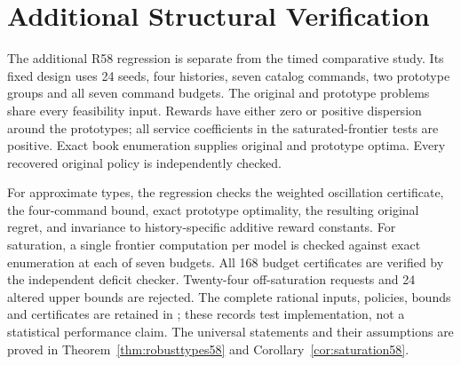 \section{Additional Structural Verification}\label{sec:structuralvalidation58}
The additional R58 regression is separate from the timed comparative study. Its fixed design uses 24 seeds, four histories, seven catalog commands, two prototype groups and all seven command budgets. The original and prototype problems share every feasibility input. Rewards have either zero or positive dispersion around the prototypes; all service coefficients in the saturated-frontier tests are positive. Exact book enumeration supplies original and prototype optima. Every recovered original policy is independently checked.

For approximate types, the regression checks the weighted oscillation certificate, the four-command bound, exact prototype optimality, the resulting original regret, and invariance to history-specific additive reward constants. For saturation, a single frontier computation per model is checked against exact enumeration at each of seven budgets. All 168 budget certificates are verified by the independent deficit checker. Twenty-four off-saturation requests and 24 altered upper bounds are rejected. The complete rational inputs, policies, bounds and certificates are retained in ; these records test implementation, not a statistical performance claim. The universal statements and their assumptions are proved in Theorem~\ref{thm:robusttypes58} and Corollary~\ref{cor:saturation58}.
